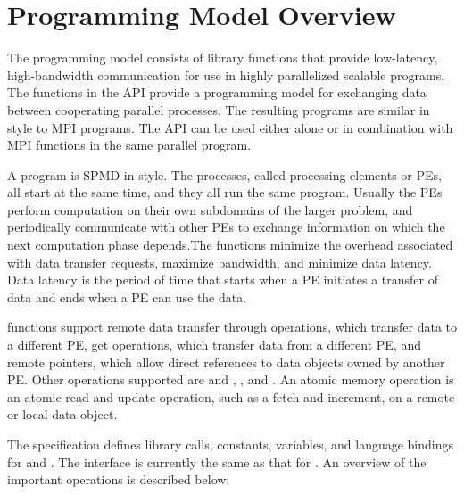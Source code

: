 \section{Programming Model Overview}
The \openshmem programming model consists of library functions that provide
low-latency, high-bandwidth communication  for  use  in  highly  parallelized 
scalable programs. The functions in the \openshmem \ac{API} provide a programming 
model for exchanging data between cooperating parallel processes. The resulting programs are similar 
in style to \ac{MPI} programs. The \openshmem \ac{API} can be used either alone 
or in combination with \ac{MPI} functions in the same parallel program.

A \openshmem program is \ac{SPMD} in style. The
\openshmem  processes,  called  processing elements or \ac{PE}s, all start at the
same time, and they all run the same program.  Usually the \ac{PE}s  perform
computation on their own subdomains of the larger problem, and periodically 
communicate with other \ac{PE}s to exchange information on which the
next computation phase depends.The \openshmem functions minimize the overhead associated with data transfer
requests, maximize bandwidth, and minimize data latency.  Data latency
is  the  period  of  time that starts when a \ac{PE} initiates a transfer of data 
and ends when a \ac{PE} can use the data.

\openshmem functions support remote data transfer through  operations, which  transfer data to a 
different \ac{PE}, get operations, which transfer data from a different \ac{PE}, and remote pointers, which 
allow direct  references  to  data objects owned by another \ac{PE}. Other operations supported are  
 and , , and . 
An atomic memory operation  is an atomic read-and-update operation, such as a fetch-and-increment, on a remote
or local data object.

The \openshmem{} specification defines library calls, constants, variables, and language bindings for \Clang{} and \Fortran{}.
The \Cpp{} interface is currently the same as that for \Clang. An overview of the important \openshmem{} operations is described below:

